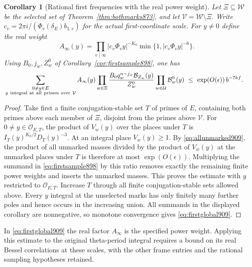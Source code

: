 \documentclass[a4paper,11pt]{article}
\newtheorem{corollary}[proposition]{Corollary}
\theoremstyle{definition}
\theoremstyle{remark}
\numberwithin{equation}{section}
\begin{document}
\begin{corollary}[Rational first frequencies with the real power weight]
\leavevmode\label{cor:firstglobal909}
Let \(\Xi\subseteq\mathcal W\) be the selected set of
Theorem~\ref{thm:bothmarks873}, and let
\(\mathcal V=\mathcal W\setminus\Xi\).
Write \(c_v=2\pi i/(\Phi_v(\delta_E)b_{1,v})\) for the actual
first-coordinate scale. For \(y\ne0\) define the real weight
\[
       A_\infty(y)=\prod_{v\mid\infty}
           |c_v\Phi_v y|^{-K_0}\min\{1,|c_v\Phi_v y|^{-6}\}.
\]
Using \(B_0,j_w,Z_w^0\) of Corollary~\ref{cor:firstsample898},
one has
\begin{align}
 &\sum_{\substack{0\ne y\in E\\y\ {\rm integral\ at\ all\ primes\
                  over}\ \mathcal V}}
 A_\infty(y)
 \prod_{w\in\Xi}
       \frac{B_0 q_w^{n-j_w}\mathcal B_{Z_w}(y)}{Z_w^0}
 \prod_{w\in\mathcal U}\mathcal B^0_w(y)
                    \ \le\ \exp(O(\epsilon))\, b^{-7kf}.
 \label{eq:firstglobal909}
\end{align}
\end{corollary}
\begin{proof}
Take first a finite conjugation-stable set \(T\) of primes of
\(E\), containing both primes above each member of \(\Xi\),
disjoint from the primes above \(\mathcal V\). For
\(0\ne y\in\mathcal O_{E,T}\), the product of \(V_w(y)\) over
the places under \(T\) is \(I_T(y)^{K_0/2}D_T(y)^{-3}\).
At an integral place \(V_w(y)\ge1\). By
\eqref{eq:allunmarked909}, the product of all unmarked masses
divided by the product of \(V_w(y)\) at the unmarked places
under \(T\) is therefore at most \(\exp(O(\epsilon))\).
Multiplying the summand in \eqref{eq:firstsample898} by this
ratio removes exactly the remaining finite power weights and
inserts the unmarked masses. This proves the estimate with
\(y\) restricted to \(\mathcal O_{E,T}\). Increase \(T\)
through all finite conjugation-stable sets allowed above.
Every \(y\) integral at the unselected marks has only finitely
many further poles and hence occurs in the increasing union.
All summands in the displayed corollary are nonnegative, so
monotone convergence gives \eqref{eq:firstglobal909}.
\end{proof}

In \eqref{eq:firstglobal909} the real factor \(A_\infty\) is the
specified power weight. Applying this estimate to the original
theta-period integral requires a bound on its real Bessel
correlations at these scales, with the other frame entries and
the rational sampling hypotheses retained.
\clearpage
\end{document}
